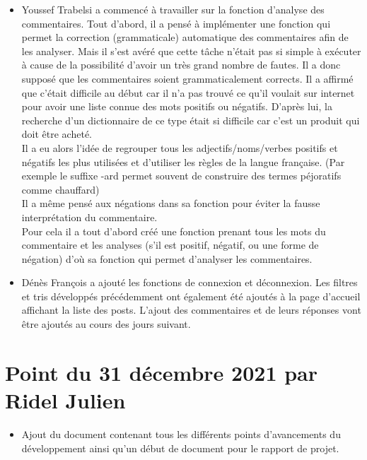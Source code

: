 \documentclass{article}
\begin{document}
\begin{itemize}

    \item \Large Youssef Trabelsi a commencé à travailler sur la fonction d'analyse des commentaires. Tout d’abord, il a pensé à implémenter une fonction qui permet la correction (grammaticale) automatique des commentaires afin de les analyser. Mais il s’est avéré que cette tâche n’était pas si simple à exécuter à cause de la possibilité d'avoir un très grand nombre de fautes. Il a donc supposé que les commentaires soient grammaticalement corrects. Il a affirmé que c’était difficile au début car il n’a pas trouvé ce qu’il voulait sur internet pour avoir une liste connue des mots positifs ou négatifs. D’après lui, la recherche d'un dictionnaire de ce type était si difficile car c’est un produit qui doit être acheté. \\
    Il a eu alors l’idée de regrouper tous les adjectifs/noms/verbes positifs et négatifs les plus utilisées et d’utiliser les règles de la langue française. (Par exemple le suffixe -ard permet souvent de construire des termes péjoratifs comme chauffard)\\
    Il a même pensé aux négations dans sa fonction pour éviter la fausse interprétation du commentaire.\\
    Pour cela il a tout d’abord créé une fonction prenant tous les mots du commentaire et les analyses (s’il est positif, négatif, ou une forme de négation) d’où sa fonction qui permet d'analyser les commentaires.
    
    \item \Large Dénès François a ajouté les fonctions de connexion et déconnexion. Les filtres et tris développés précédemment ont également été ajoutés à la page d'accueil affichant la liste des posts. L'ajout des commentaires et de leurs réponses vont être ajoutés au cours des jours suivant.
    
\end{itemize}

\section{\huge Point du 31 décembre 2021 par Ridel Julien}

\begin{itemize}

    \item \Large Ajout du document contenant tous les différents points d'avancements du développement ainsi qu'un début de document pour le rapport de projet.
    
\end{itemize}
\end{document}
